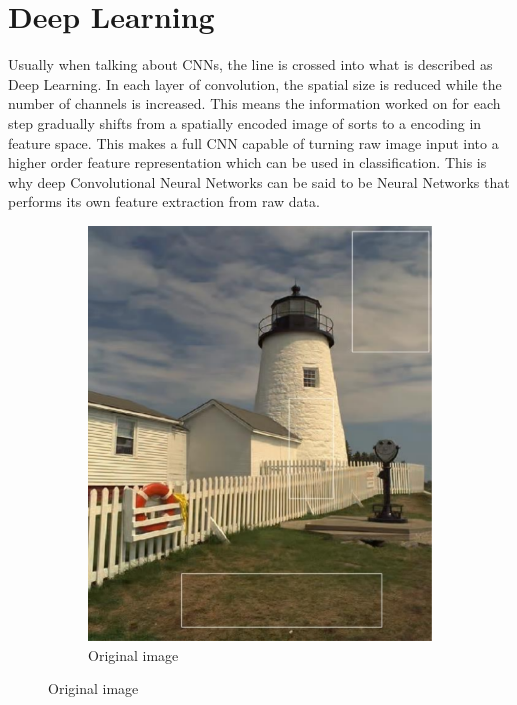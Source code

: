 \section{Deep Learning}
Usually when talking about CNNs, the line is crossed into what is described as Deep Learning. In each layer of convolution, the spatial size is reduced while the number of channels is increased. This means the information worked on for each step gradually shifts from a spatially encoded image of sorts to a encoding in feature space. This makes a full CNN capable of turning raw image input into a higher order feature representation which can be used in classification. This is why deep Convolutional Neural Networks can be said to be Neural Networks that performs its own feature extraction from raw data.

\begin{figure}
    \begin{subfigure}[h]{0.49\linewidth}
        \includegraphics[width=\linewidth]{Chapters/Background/figures/original.png}
        \caption{Original image}
    \end{subfigure}
    \hfill

\end{figure}
